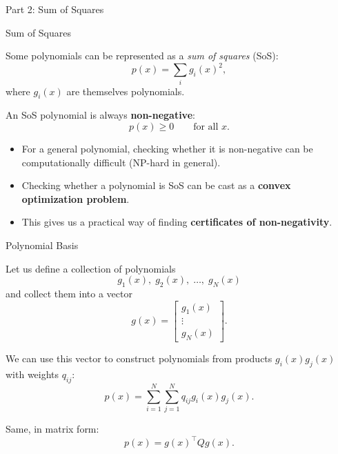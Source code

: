 \documentclass{beamer}
\begin{document}
\begin{frame}
	\begin{center}
		{\Large Part 2: Sum of Squares}
	\end{center}
\end{frame}


\begin{frame}{Sum of Squares}
	\begin{flushleft}
		Some polynomials can be represented as a \emph{sum of squares} (SoS):
		\[
		p(x) = \sum_i g_i(x)^2,
		\]
		where $g_i(x)$ are themselves polynomials.
		
		\bigskip
		
		An SoS polynomial is always \textbf{non-negative}:
		\[
		p(x) \geq 0 \qquad \text{for all }x.
		\]
		
		\bigskip
		
		\begin{itemize}
			\item For a general polynomial, checking whether it is non-negative
			can be computationally difficult (NP-hard in general).
		
			
			\item Checking whether a polynomial is SoS can be cast as a
			\textbf{convex optimization problem}.
			
			\item This gives us a practical way of finding
			\textbf{certificates of non-negativity}.
		\end{itemize}
		
	\end{flushleft}
\end{frame}


\begin{frame}{Polynomial Basis}
	\begin{flushleft}
		
		Let us define a collection of polynomials
		\[
		g_1(x),\;g_2(x),\;\ldots,\;g_N(x)
		\]
		and collect them into a vector
		\[
		g(x)=
		\begin{bmatrix}
			g_1(x)\\
			\vdots\\
			g_N(x)
		\end{bmatrix}.
		\]
		
		\bigskip
		
		We can use this vector to construct polynomials from products
		$g_i(x)g_j(x)$ with weights $q_{ij}$:
		\[
		p(x)=\sum_{i=1}^N\sum_{j=1}^N
		q_{ij}g_i(x)g_j(x).
		\]
		
		\bigskip
		
		Same, in matrix form:
		\[
		p(x)=g(x)^\top Qg(x).
		\]
		
		
	\end{flushleft}
\end{frame}
\end{document}
